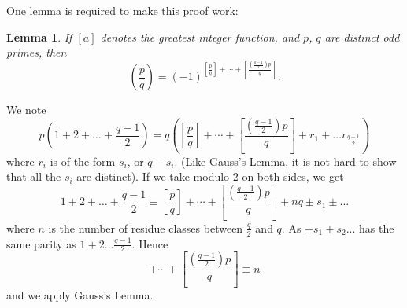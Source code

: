 \documentclass{article}
\newtheorem{lemma}[theorem]{Lemma}
\newcommand{\legendre}[2]{\genfrac{(}{)}{}{}{#1}{#2}}
\begin{document}
\subsubsection{}
One lemma is required to make this proof work:
\begin{lemma}
    If $[a]$ denotes the greatest integer function, and $p$, $q$ are distinct odd primes, then
    \begin{equation}
    \legendre{p}{q} = (-1)^{[\frac{p}{q}] + \cdots
                                + [\frac{(\frac{q-1}{2})p}{q}]}.
    \end{equation}
\end{lemma}
We note
\begin{equation}
    p(1+2+\dots + \frac{q-1}{2}) = q([\frac{p}{q}] + \cdots
                        + [\frac{(\frac{q-1}{2})p}{q}]
                        + r_{1} + \dots r_{\frac{q-1}{2}})
\end{equation}
where $r_{i}$ is of the form $s_{i}$, or $q-s_{i}$. (Like Gauss's Lemma, it is not hard to show that all the $s_{i}$ are distinct). If we take modulo 2 on both sides, we get
\begin{equation}
    1+2+\dots+\frac{q-1}{2} \equiv [\frac{p}{q}] + \cdots
                        + [\frac{(\frac{q-1}{2})p}{q}]
                        + nq \pm s_{1} \pm ...
\end{equation}
where $n$ is the number of residue classes between $\frac{q}{2}$ and $q$. As $\pm s_{1} \pm s_{2} ...$ has the same parity as $1+2\dots \frac{q-1}{2}$. Hence
\begin{equation}
    [\frac{p}{q}] + \cdots
                        + [\frac{(\frac{q-1}{2})p}{q}] \equiv n
\end{equation}
and we apply Gauss's Lemma.
\end{document}
